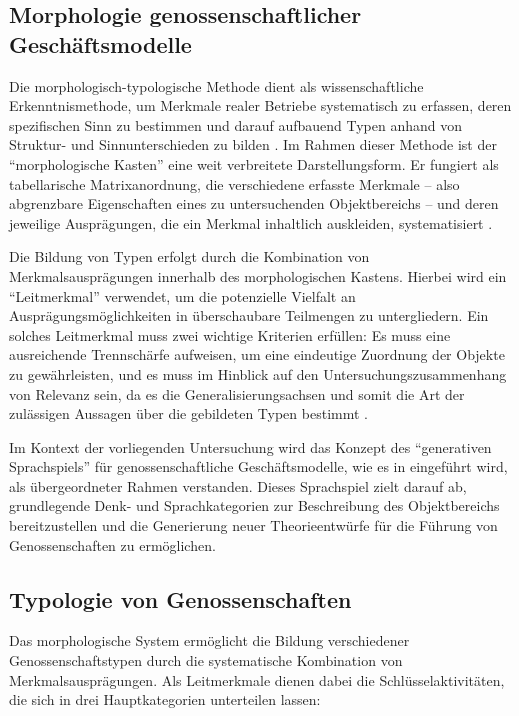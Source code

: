 \subsection{Morphologie genossenschaftlicher Geschäftsmodelle}

Die morphologisch-typologische Methode dient als wissenschaftliche Erkenntnismethode, um Merkmale realer Betriebe systematisch zu erfassen, deren spezifischen Sinn zu bestimmen und darauf aufbauend Typen anhand von Struktur- und Sinnunterschieden zu bilden \autocite{blome-dreesGenossenschaftlicheGeschaeftsmodelleSemantik2023}. Im Rahmen dieser Methode ist der \enquote{morphologische Kasten} eine weit verbreitete Darstellungsform. Er fungiert als tabellarische Matrixanordnung, die verschiedene erfasste Merkmale – also abgrenzbare Eigenschaften eines zu untersuchenden Objektbereichs – und deren jeweilige Ausprägungen, die ein Merkmal inhaltlich auskleiden, systematisiert \autocite{blome-dreesGenossenschaftlicheGeschaeftsmodelleSemantik2023}.

Die Bildung von Typen erfolgt durch die Kombination von Merkmalsausprägungen innerhalb des morphologischen Kastens. Hierbei wird ein \enquote{Leitmerkmal} verwendet, um die potenzielle Vielfalt an Ausprägungsmöglichkeiten in überschaubare Teilmengen zu untergliedern. Ein solches Leitmerkmal muss zwei wichtige Kriterien erfüllen: Es muss eine ausreichende Trennschärfe aufweisen, um eine eindeutige Zuordnung der Objekte zu gewährleisten, und es muss im Hinblick auf den Untersuchungszusammenhang von Relevanz sein, da es die Generalisierungsachsen und somit die Art der zulässigen Aussagen über die gebildeten Typen bestimmt \autocite{blome-dreesGenossenschaftlicheGeschaeftsmodelleSemantik2023}.

Im Kontext der vorliegenden Untersuchung wird das Konzept des \enquote{generativen Sprachspiels} für genossenschaftliche Geschäftsmodelle, wie es in \textcite{blome-dreesGenossenschaftlicheGeschaeftsmodelleSemantik2023} eingeführt wird, als übergeordneter Rahmen verstanden. Dieses Sprachspiel zielt darauf ab, grundlegende Denk- und Sprachkategorien zur Beschreibung des Objektbereichs bereitzustellen und die Generierung neuer Theorieentwürfe für die Führung von Genossenschaften zu ermöglichen.


\subsection{Typologie von Genossenschaften}

Das morphologische System ermöglicht die Bildung verschiedener Genossenschaftstypen durch die systematische Kombination von Merkmalsausprägungen. Als Leitmerkmale dienen dabei die Schlüsselaktivitäten, die sich in drei Hauptkategorien unterteilen lassen:

